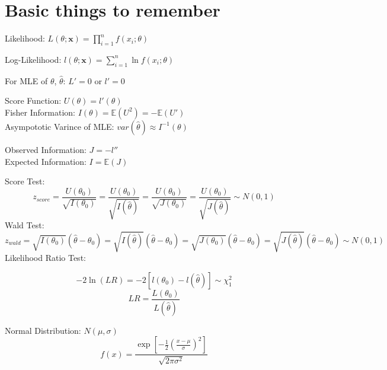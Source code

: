 \documentclass[a4paper]{article}
\begin{document}



\section*{Basic things to remember}
\begin{multicols}{2}
	\begin{center}
		Likelihood: $L(\theta; \mathbf{x}) = \prod_{i=1}^n f(x_i;\theta)$
	\end{center}
	\begin{center}
		Log-Likelihood: $l(\theta; \mathbf{x}) = \sum_{i=1}^n \ln{f(x_i;\theta)}$
	\end{center}
\end{multicols}
	\begin{center}
		For MLE of $\theta$, $\hat{\theta}$: $L' = 0$ or $l' = 0$
	\end{center}
Score Function: $U(\theta) = l'(\theta)$\\
Fisher Information: $I(\theta) = \mathbb{E}(U^2) = -\mathbb{E}(U')$\\
Asympototic Varince of MLE: $var(\hat{\theta}) \approx I^{-1}(\theta)$
\begin{multicols}{2}
	\begin{center}
		Observed Information: $J = -l''$\\
		Expected Information: $I = \mathbb{E}(J)$
	\end{center}
\end{multicols}
Score Test: $$z_{score} = \frac{U(\theta_0)}{\sqrt{I(\theta_0)}} = \frac{U(\theta_0)}{\sqrt{I(\hat{\theta})}} = \frac{U(\theta_0)}{\sqrt{J(\theta_0)}} = \frac{U(\theta_0)}{\sqrt{J(\hat{\theta})}} \sim N(0,1)$$
Wald Test: $$z_{wald} = \sqrt{I(\theta_0)}(\hat{\theta} - \theta_0) = \sqrt{I(\hat{\theta})}(\hat{\theta} - \theta_0) = \sqrt{J(\theta_0)}(\hat{\theta} - \theta_0) = \sqrt{J(\hat{\theta})}(\hat{\theta} - \theta_0) \sim N(0,1)$$
Likelihood Ratio Test:
	\begin{multicols}{2}
		$$-2\ln(LR) = -2[l(\theta_0)-l(\hat{\theta})] \sim \chi_1^2$$
		$$LR = \frac{L(\theta_0)}{L({\hat{\theta}})}$$
	\end{multicols}
Normal Distribution: $N(\mu,\sigma)$
	$$f(x) = \frac{\exp\left[{-\frac{1}{2}\left(\frac{x-\mu}{\sigma}\right)^2}\right]}{\sqrt{2\pi\sigma^2}}$$
\end{document}

